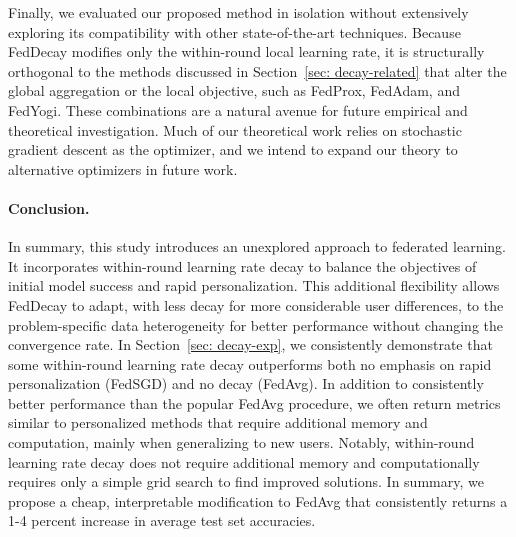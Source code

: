 Finally, we evaluated our proposed method in isolation without extensively exploring its compatibility with other state-of-the-art techniques.
Because FedDecay modifies only the within-round local learning rate, it is structurally orthogonal to the methods discussed in Section~\ref{sec: decay-related} that alter the global aggregation or the local objective, such as FedProx, FedAdam, and FedYogi.
These combinations are a natural avenue for future empirical and theoretical investigation.
Much of our theoretical work relies on stochastic gradient descent as the optimizer, and we intend to expand our theory to alternative optimizers in future work.

\paragraph{Conclusion.}
In summary, this study introduces an unexplored approach to federated learning. It incorporates within-round learning rate decay to balance the objectives of initial model success and rapid personalization.
This additional flexibility allows FedDecay to adapt, with less decay for more considerable user differences, to the problem-specific data heterogeneity for better performance without changing the convergence rate.
In Section~\ref{sec: decay-exp}, we consistently demonstrate that some within-round learning rate decay outperforms both no emphasis on rapid personalization (FedSGD) and no decay (FedAvg).
In addition to consistently better performance than the popular FedAvg procedure, we often return metrics similar to personalized methods that require additional memory and computation, mainly when generalizing to new users.
Notably, within-round learning rate decay does not require additional memory and computationally requires only a simple grid search to find improved solutions.
In summary, we propose a cheap, interpretable modification to FedAvg that consistently returns a 1-4 percent increase in average test set accuracies.
